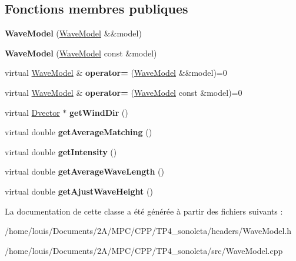 \subsection*{Fonctions membres publiques}
\begin{DoxyCompactItemize}
\item 
\mbox{\label{class_wave_model_a22d9989890929f0418fcf7f1bd1fe489}} 
{\bfseries Wave\+Model} (\hyperlink{class_wave_model}{Wave\+Model} \&\&model)
\item 
\mbox{\label{class_wave_model_a1991dab09a570054adffc3677e218556}} 
{\bfseries Wave\+Model} (\hyperlink{class_wave_model}{Wave\+Model} const \&model)
\item 
\mbox{\label{class_wave_model_a3b52480b59f4c5f3d0d749d400f9e14c}} 
virtual \hyperlink{class_wave_model}{Wave\+Model} \& {\bfseries operator=} (\hyperlink{class_wave_model}{Wave\+Model} \&\&model)=0
\item 
\mbox{\label{class_wave_model_a3794a5af00e6f216009fd8b54d48caf3}} 
virtual \hyperlink{class_wave_model}{Wave\+Model} \& {\bfseries operator=} (\hyperlink{class_wave_model}{Wave\+Model} const \&model)=0
\item 
\mbox{\label{class_wave_model_abe94f9621e5aaca300d8312479051710}} 
virtual \hyperlink{class_dvector}{Dvector} $\ast$ {\bfseries get\+Wind\+Dir} ()
\item 
\mbox{\label{class_wave_model_a829250f96303b3e9ddd9c2c6cbb0e3be}} 
virtual double {\bfseries get\+Average\+Matching} ()
\item 
\mbox{\label{class_wave_model_ab72286fdfe57cebaae70af46c69dacb1}} 
virtual double {\bfseries get\+Intensity} ()
\item 
\mbox{\label{class_wave_model_af73c7bfe6c6c2d1546e7aaa966879ca3}} 
virtual double {\bfseries get\+Average\+Wave\+Length} ()
\item 
\mbox{\label{class_wave_model_a6ce936ce9c4d27170bd0f7a6cd28b31f}} 
virtual double {\bfseries get\+Ajust\+Wave\+Height} ()
\end{DoxyCompactItemize}


La documentation de cette classe a été générée à partir des fichiers suivants \+:\begin{DoxyCompactItemize}
\item 
/home/louis/\+Documents/2\+A/\+M\+P\+C/\+C\+P\+P/\+T\+P4\+\_\+sonoleta/headers/Wave\+Model.\+h\item 
/home/louis/\+Documents/2\+A/\+M\+P\+C/\+C\+P\+P/\+T\+P4\+\_\+sonoleta/src/Wave\+Model.\+cpp\end{DoxyCompactItemize}
